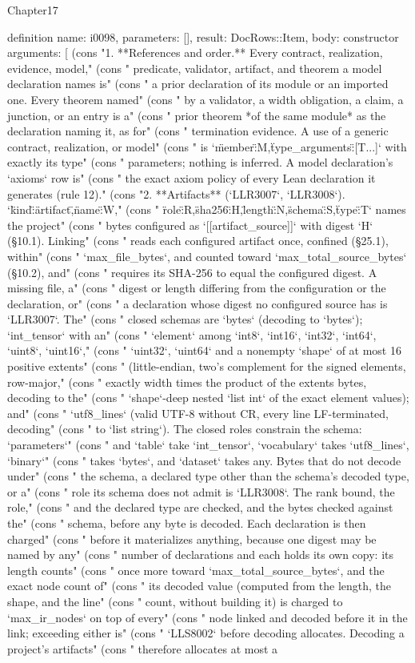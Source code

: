 \begin{lexlean}{Chapter17}
\begin{semanticmodule}
definition{
  name: i0098,
  parameters: [],
  result: DocRows::Item,
  body: constructor{
    arguments: [
      (cons "1. **References and order.** Every contract, realization, evidence, model," (cons "   predicate, validator, artifact, and theorem a model declaration names is" (cons "   a prior declaration of its module or an imported one. Every theorem named" (cons "   by a validator, a width obligation, a claim, a junction, or an entry is a" (cons "   prior theorem *of the same module* as the declaration naming it, as for" (cons "   termination evidence. A use of a generic contract, realization, or model" (cons "   is `{\"member\":M,\"type_arguments\":[T...]}` with exactly its type" (cons "   parameters; nothing is inferred. A model declaration's `axioms` row is" (cons "   the exact axiom policy of every Lean declaration it generates (rule 12)." (cons "2. **Artifacts** (`LLR3007`, `LLR3008`). `{\"kind\":\"artifact\",\"name\":W," (cons "   \"role\":R,\"sha256\":H,\"length\":N,\"schema\":S,\"type\":T}` names the project" (cons "   bytes configured as `[[artifact_source]]` with digest `H` (§10.1). Linking" (cons "   reads each configured artifact once, confined (§25.1), within" (cons "   `max_file_bytes`, and counted toward `max_total_source_bytes` (§10.2), and" (cons "   requires its SHA-256 to equal the configured digest. A missing file, a" (cons "   digest or length differing from the configuration or the declaration, or" (cons "   a declaration whose digest no configured source has is `LLR3007`. The" (cons "   closed schemas are `bytes` (decoding to `bytes`); `int_tensor` with an" (cons "   `element` among `int8`, `int16`, `int32`, `int64`, `uint8`, `uint16`," (cons "   `uint32`, `uint64` and a nonempty `shape` of at most 16 positive extents" (cons "   (little-endian, two's complement for the signed elements, row-major," (cons "   exactly width times the product of the extents bytes, decoding to the" (cons "   `shape`-deep nested `list int` of the exact element values); and" (cons "   `utf8_lines` (valid UTF-8 without CR, every line LF-terminated, decoding" (cons "   to `list string`). The closed roles constrain the schema: `parameters`" (cons "   and `table` take `int_tensor`, `vocabulary` takes `utf8_lines`, `binary`" (cons "   takes `bytes`, and `dataset` takes any. Bytes that do not decode under" (cons "   the schema, a declared type other than the schema's decoded type, or a" (cons "   role its schema does not admit is `LLR3008`. The rank bound, the role," (cons "   and the declared type are checked, and the bytes checked against the" (cons "   schema, before any byte is decoded. Each declaration is then charged" (cons "   before it materializes anything, because one digest may be named by any" (cons "   number of declarations and each holds its own copy: its length counts" (cons "   once more toward `max_total_source_bytes`, and the exact node count of" (cons "   its decoded value (computed from the length, the shape, and the line" (cons "   count, without building it) is charged to `max_ir_nodes` on top of every" (cons "   node linked and decoded before it in the link; exceeding either is" (cons "   `LLS8002` before decoding allocates. Decoding a project's artifacts" (cons "   therefore allocates at most a }}
\end{semanticmodule}
\end{lexlean}
